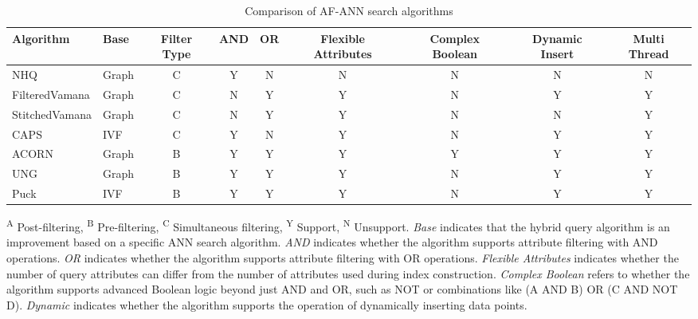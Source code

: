 \documentclass[sigconf, nonacm]{acmart}
\begin{document}
	\setlength{\textfloatsep}{0cm}
	\setlength{\floatsep}{0cm}
	\begin{table}[t]
		\centering
		\setlength{\abovecaptionskip}{0.1cm}
		\setlength{\belowcaptionskip}{-0.2cm}
		\caption{Comparison of AF-ANN search algorithms}
		\small
		\label{tab:compair_1}
		\begin{tabular}{|l|l|c|c|c|c|c|c|c|}
			\hline
			\textbf{Algorithm} & \textbf{Base} & \textbf{Filter Type} & \textbf{AND} & \textbf{OR} & \textbf{Flexible Attributes} & \textbf{Complex Boolean} & \textbf{Dynamic Insert} & \textbf{Multi Thread} \\
			\hline
			NHQ & Graph & C & Y & N& N& N & N & N \\
			FilteredVamana & Graph & C & N & Y & Y & N & Y & Y \\
			StitchedVamana & Graph & C & N & Y & Y & N & N & Y  \\
			CAPS & IVF & C & Y & N & Y & N & Y & Y \\
			ACORN & Graph & B & Y & Y & Y & Y & Y & Y \\
			UNG & Graph & B & Y & Y & Y & N & Y & Y \\ 
			Puck & IVF & B & Y & Y & Y & N & Y & Y \\
			
			\hline
			
		\end{tabular}
		
		
		\centering
		\footnotesize{
			\begin{minipage}{\linewidth}
				\vspace{0.1cm}
				\textsuperscript{A} Post-filtering, 
				\textsuperscript{B} Pre-filtering, 
				\textsuperscript{C} Simultaneous filtering, 
				\textsuperscript{Y} Support, 
				\textsuperscript{N} Unsupport. 
				\textit{Base} indicates that the hybrid query algorithm is an improvement based on a specific ANN search algorithm. 
				\textit{AND} indicates whether the algorithm supports attribute filtering with AND operations. 
				\textit{OR} indicates whether the algorithm supports attribute filtering with OR operations. 
				\textit{Flexible Attributes} indicates whether the number of query attributes can differ from the number of attributes used during index construction. 
				\textit{Complex Boolean} refers to whether the algorithm supports advanced Boolean logic beyond just AND and OR, such as NOT or combinations like (A AND B) OR (C AND NOT D). 
				\textit{Dynamic} indicates whether the algorithm supports the operation of dynamically inserting data points.
		\end{minipage}}
		\vspace{-0.3cm}
	\end{table}
	
\end{document}
